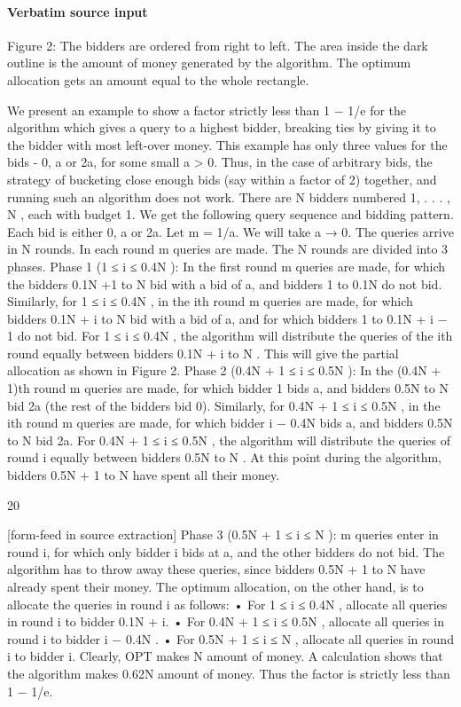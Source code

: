 \documentclass[10pt]{article}
\begin{document}
\paragraph{Verbatim source input}
\begin{ReviewVerbatim}
Figure 2: The bidders are ordered from right to left. The area inside the dark outline is the amount
of money generated by the algorithm. The optimum allocation gets an amount equal to the whole
rectangle.

We present an example to show a factor strictly less than 1 − 1/e for the algorithm which gives
a query to a highest bidder, breaking ties by giving it to the bidder with most left-over money.
This example has only three values for the bids - 0, a or 2a, for some small a > 0. Thus, in
the case of arbitrary bids, the strategy of bucketing close enough bids (say within a factor of
2) together, and running such an algorithm does not work.
There are N bidders numbered 1, . . . , N , each with budget 1. We get the following query
sequence and bidding pattern. Each bid is either 0, a or 2a. Let m = 1/a. We will take a → 0.
The queries arrive in N rounds. In each round m queries are made. The N rounds are divided
into 3 phases.
Phase 1 (1 ≤ i ≤ 0.4N ): In the first round m queries are made, for which the bidders 0.1N +1
to N bid with a bid of a, and bidders 1 to 0.1N do not bid. Similarly, for 1 ≤ i ≤ 0.4N , in
the ith round m queries are made, for which bidders 0.1N + i to N bid with a bid of a, and
for which bidders 1 to 0.1N + i − 1 do not bid.
For 1 ≤ i ≤ 0.4N , the algorithm will distribute the queries of the ith round equally between
bidders 0.1N + i to N . This will give the partial allocation as shown in Figure 2.
Phase 2 (0.4N + 1 ≤ i ≤ 0.5N ): In the (0.4N + 1)th round m queries are made, for which
bidder 1 bids a, and bidders 0.5N to N bid 2a (the rest of the bidders bid 0). Similarly, for
0.4N + 1 ≤ i ≤ 0.5N , in the ith round m queries are made, for which bidder i − 0.4N bids a,
and bidders 0.5N to N bid 2a.
For 0.4N + 1 ≤ i ≤ 0.5N , the algorithm will distribute the queries of round i equally between
bidders 0.5N to N .
At this point during the algorithm, bidders 0.5N + 1 to N have spent all their money.

20


[form-feed in source extraction]
Phase 3 (0.5N + 1 ≤ i ≤ N ): m queries enter in round i, for which only bidder i bids at a,
and the other bidders do not bid.
The algorithm has to throw away these queries, since bidders 0.5N + 1 to N have already spent
their money.
The optimum allocation, on the other hand, is to allocate the queries in round i as follows:
• For 1 ≤ i ≤ 0.4N , allocate all queries in round i to bidder 0.1N + i.
• For 0.4N + 1 ≤ i ≤ 0.5N , allocate all queries in round i to bidder i − 0.4N .
• For 0.5N + 1 ≤ i ≤ N , allocate all queries in round i to bidder i.
Clearly, OPT makes N amount of money. A calculation shows that the algorithm makes 0.62N
amount of money. Thus the factor is strictly less than 1 − 1/e.
\end{ReviewVerbatim}
\end{document}
